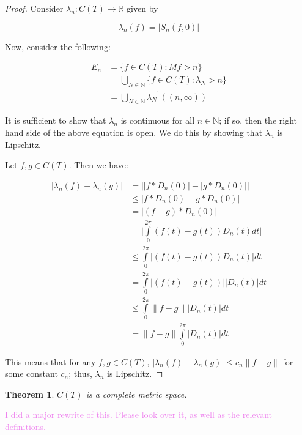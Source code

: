\documentclass{amsart}
\newcommand{\la}{\lambda}
\newcommand{\N}{\mathbb{N}}
\newcommand{\R}{\mathbb{R}}
\newcommand{\colorcomment}[2]{\textcolor{#1}{#2}} %
\newcommand{\absval}[1]{\lvert #1 \rvert}
\newcommand{\norm}[1]{\|#1\|}
\newtheorem{thm}{Theorem}[section]
\theoremstyle{definition}
\begin{document}
\begin{proof}
Consider $\la_n: C(T) \to \R$ given by

\begin{displaymath}
\la_n(f) = \absval{S_n(f,0)}
\end{displaymath}

Now, consider the following:

\begin{align*}
E_n &= \{f \in C(T): Mf> n\} \\
&= \bigcup\limits_{N \in \N} \{f \in C(T) : \la_N > n\}\\
&= \bigcup\limits_{N \in \N} \la_N^{-1}((n, \infty))
\end{align*}

It is sufficient to show that $\la_n$ is continuous for all $n \in \N$; if so, then the right hand side of the above equation is open.
We do this by showing that $\la_n$ is Lipschitz.

Let $f, g \in C(T)$. Then we have:

\begin{align*}
\absval{\la_n(f) - \la_n(g)} &= \absval{\absval{f \ast D_n(0)} - \absval{g \ast D_n(0)}} \\
&\leq \absval{f \ast D_n(0) - g \ast D_n(0)} \\
&= \absval{(f-g) \ast D_n(0)} \\
&= \absval{\int\limits_0^{2\pi} (f(t)-g(t))D_n(t)dt} \\
&\leq \int\limits_0^{2\pi} \absval{(f(t)-g(t))D_n(t)}dt \\
&= \int\limits_0^{2\pi} \absval{(f(t)-g(t))}\absval{D_n(t)}dt \\
&\leq \int\limits_0^{2\pi} \norm{f-g}\absval{D_n(t)}dt \\
&= \norm{f-g} \int\limits_0^{2\pi} \absval{D_n(t)}dt
\end{align*}

This means that for any $f,g \in C(T)$, $\absval{\la_n(f) - \la_n(g)} \leq c_n \norm{f-g}$ for some constant $c_n$; thus, $\la_n$ is Lipschitz.

\end{proof}

\begin{thm}
$C(T)$ is a complete metric space.
\end{thm}

\colorcomment{Violet}{I did a major rewrite of this. Please look over it, as well as the relevant definitions.}
\end{document}
